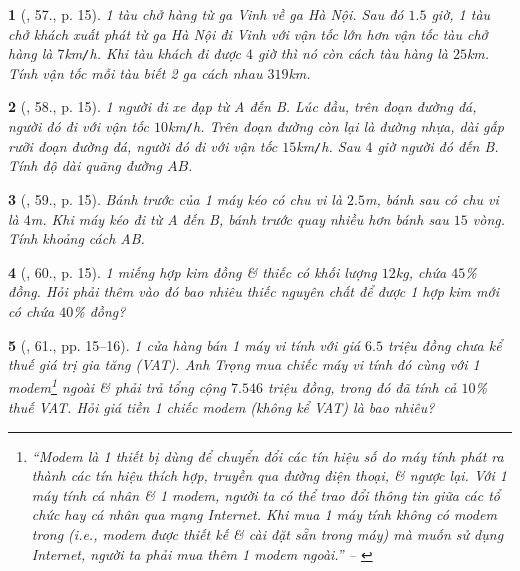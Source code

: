 \documentclass{article}
\newtheorem{baitoan}{}
\begin{document}
\begin{baitoan}[\cite{SBT_Toan_8_tap_2}, 57., p. 15]
	1 tàu chở hàng từ ga Vinh về ga Hà Nội. Sau đó $1.5$ giờ, 1 tàu chở khách xuất phát từ ga Hà Nội đi Vinh với vận tốc lớn hơn vận tốc tàu chở hàng là $7$\emph{km\texttt{/}h}. Khi tàu khách đi được $4$ giờ thì nó còn cách tàu hàng là $25$\emph{km}. Tính vận tốc mỗi tàu biết 2 ga cách nhau $319$\emph{km}.
\end{baitoan}

\begin{baitoan}[\cite{SBT_Toan_8_tap_2}, 58., p. 15]
	1 người đi xe đạp từ A đến B. Lúc đầu, trên đoạn đường đá, người đó đi với vận tốc $10$\emph{km\texttt{/}h}. Trên đoạn đường còn lại là đường nhựa, dài gấp rưỡi đoạn đường đá, người đó đi với vận tốc $15$\emph{km\texttt{/}h}. Sau $4$ giờ người đó đến B. Tính độ dài quãng đường $AB$.
\end{baitoan}

\begin{baitoan}[\cite{SBT_Toan_8_tap_2}, 59., p. 15]
	Bánh trước của 1 máy kéo có chu vi là $2.5$\emph{m}, bánh sau có chu vi là $4$\emph{m}. Khi máy kéo đi từ A đến B, bánh trước quay nhiều hơn bánh sau $15$ vòng. Tính khoảng cách AB.
\end{baitoan}

\begin{baitoan}[\cite{SBT_Toan_8_tap_2}, 60., p. 15]
	1 miếng hợp kim đồng \& thiếc có khối lượng $12$\emph{kg}, chứa $45$\% đồng. Hỏi phải thêm vào đó bao nhiêu thiếc nguyên chất để được 1 hợp kim mới có chứa $40$\% đồng?
\end{baitoan}

\begin{baitoan}[\cite{SBT_Toan_8_tap_2}, 61., pp. 15--16]
	1 cửa hàng bán 1 máy vi tính với giá $6.5$ triệu đồng chưa kể thuế giá trị gia tăng (VAT). Anh Trọng mua chiếc máy vi tính đó cùng với 1 modem\footnote{``Modem là 1 thiết bị dùng để chuyển đổi các tín hiệu số do máy tính phát ra thành các tín hiệu thích hợp, truyền qua đường điện thoại, \& ngược lại. Với 1 máy tính cá nhân \& 1 modem, người ta có thể trao đổi thông tin giữa các tổ chức hay cá nhân qua mạng Internet. Khi mua 1 máy tính không có modem trong (i.e., modem được thiết kế \& cài đặt sẵn trong máy) mà muốn sử dụng Internet, người ta phải mua thêm 1 modem ngoài.'' -- \cite[p. 15]{SBT_Toan_8_tap_2}} ngoài \& phải trả tổng cộng $7.546$ triệu đồng, trong đó đã tính cả $10$\% thuế VAT. Hỏi giá tiền 1 chiếc modem (không kể VAT) là bao nhiêu?
\end{baitoan}
\end{document}
